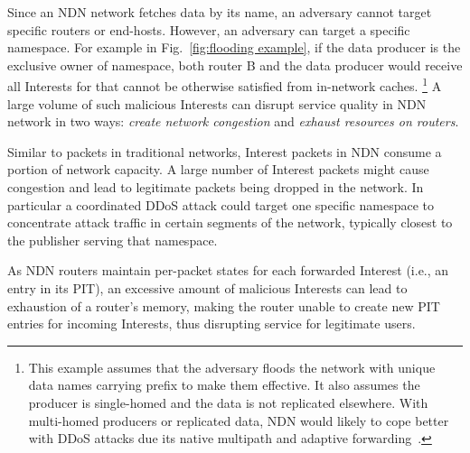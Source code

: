 Since an NDN network fetches data by its name, an adversary cannot target specific routers or end-hosts.
However, an adversary can target a specific namespace.
For example in Fig.~\ref{fig:flooding example}, if the data producer is the exclusive owner of  namespace, both router B and the data producer would receive all Interests for  that cannot be otherwise satisfied from in-network caches.%
\footnote {This example assumes that the adversary floods the network with unique data names carrying  prefix to make them effective. It also assumes the producer is single-homed and the data is not replicated elsewhere. With multi-homed producers or replicated data, NDN would likely to cope better with DDoS attacks due its native multipath and adaptive forwarding~\cite{adaptive-forwarding}.}
A large volume of such malicious Interests can disrupt service quality in NDN network in two ways: \emph{create network congestion} and \emph{exhaust resources on routers}.

Similar to packets in traditional networks, Interest packets in NDN consume a portion of network capacity. A large number of Interest packets might cause congestion and lead to legitimate packets being dropped in the network. In particular a coordinated DDoS attack could target one specific namespace to concentrate attack traffic in certain segments of the network, typically closest to the publisher serving that namespace.

As NDN routers maintain per-packet states for each forwarded Interest (i.e., an entry in its PIT), an excessive amount of malicious Interests can lead to exhaustion of a router's memory, making the router unable to create new PIT entries for incoming Interests, thus disrupting service for legitimate users.





